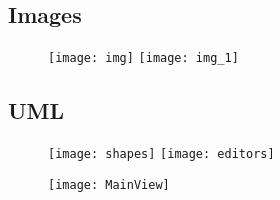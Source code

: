 \subsection{Images}

\begin{figure}[H]
\texttt{[image: img]}
\texttt{[image: img\_1]}
\centering
\end{figure}

\subsection{UML}
\begin{figure}[H]
    \texttt{[image: shapes]}
    \texttt{[image: editors]}
\end{figure}

\begin{figure}[H]
    \texttt{[image: MainView]}
\end{figure}
